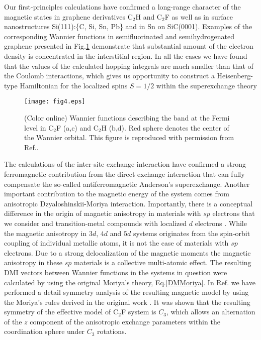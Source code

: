\documentclass[aps,prl,twocolumn,showpacs,amsmath,amssymb]{revtex4-1}
\begin{document}
Our first-principles calculations \cite{C2F, Si,SiC} have confirmed a long-range character of the magnetic states in graphene derivatives C$_2$H and C$_2$F as well as in surface nanostructures Si(111):\{C, Si, Sn, Pb\} and in Sn on  SiC(0001). Examples of the corresponding Wannier functions in semifluorinated and semihydrogenated graphene presented in Fig.\ref{ris:wannier_functions} demonstrate that substantial amount of the electron density is concentrated in the interstitial region. In all the cases we have found that the values of the calculated hopping integrals are much smaller than that of the Coulomb interactions, which gives us opportunity to construct a Heisenberg-type Hamiltonian for the localized spins $S=1/2$ within the superexchange theory

\begin{figure}[!h]
\texttt{[image: fig4.eps]}
\caption{(Color online) Wannier functions describing the band at the Fermi level in C$_{2}$F (a,c) and C$_2$H (b,d). Red sphere denotes the center of the Wannier orbital. This figure is reproduced with permission from Ref.\cite{C2F}.}
\label{ris:wannier_functions}
\end{figure}

The calculations of the inter-site exchange interaction have confirmed a strong ferromagnetic contribution from the direct exchange interaction that can fully compensate the so-called antiferromagnetic Anderson's superexchange.
Another important contribution to the magnetic energy of the system comes from anisotropic Dzyaloshinskii-Moriya interaction. Importantly,  there is a conceptual difference in the origin of magnetic anisotropy in materials with $sp$ electrons that we consider and transition-metal compounds with localized $d$ electrons \cite{Wenzel,Torun}.  While the magnetic anisotropy in $3d$, $4d$ and $5d$ systems originates from the spin-orbit coupling of individual metallic atoms, it is not the case of materials with $sp$ electrons. Due to a strong delocalization of the magnetic moments  the magnetic anisotropy in these $sp$ materials is a collective multi-atomic effect. The resulting DMI vectors between Wannier functions in the systems in question were calculated by using the original Moriya's theory, Eq.\ref{DMMoriya}. In Ref.\cite{C2F} we have performed a detail symmetry analysis of the resulting magnetic model by using the Moriya's rules derived in the original work \cite{moriya}. It was shown that the resulting symmetry of the effective model of C$_2$F system is $C_{3}$, which allows an alternation of the $z$ component of the anisotropic exchange parameters within the coordination sphere under $C_{3}$ rotations.
\end{document}
